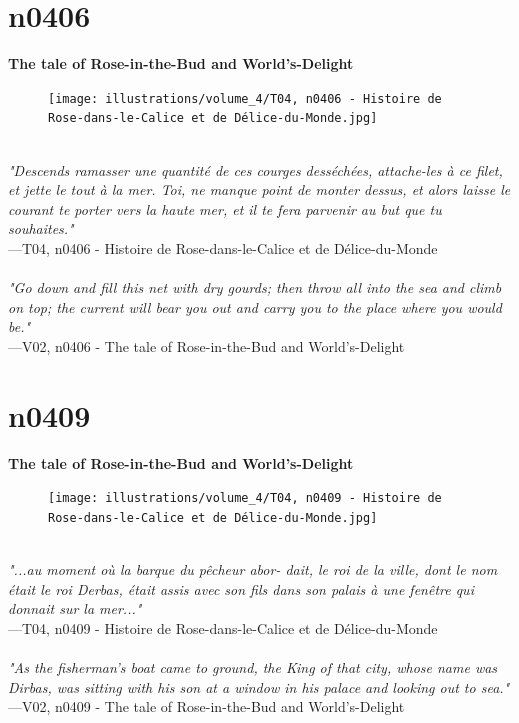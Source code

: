 \documentclass[../Carre_nights.tex]{subfiles}
\begin{document}
\newpage

\section{n0406}
\textbf{\Large{The tale of Rose-in-the-Bud and World’s-Delight}} \\

\begin{figure}[ht]
\centering
\texttt{[image: illustrations/volume\_4/T04, n0406 - Histoire de Rose-dans-le-Calice et de Délice-du-Monde.jpg]}
\end{figure}

\textit{\\
"Descends ramasser une quantité de ces courges desséchées, attache-les à ce filet, et jette le tout à la mer. Toi, ne manque point de monter dessus, et alors laisse le courant te porter vers la haute mer, et il te fera parvenir au but que tu souhaites."} \\
—T04, n0406 - Histoire de Rose-dans-le-Calice et de Délice-du-Monde \\~\\
\textit{"Go down and fill this net with dry gourds; then throw all into the sea and climb on top; the current will bear you out and carry you to the place where you would be."} \\
—V02, n0406 - The tale of Rose-in-the-Bud and World’s-Delight

\newpage

\section{n0409}
\textbf{\Large{The tale of Rose-in-the-Bud and World’s-Delight}} \\

\begin{figure}[ht]
\centering
\texttt{[image: illustrations/volume\_4/T04, n0409 - Histoire de Rose-dans-le-Calice et de Délice-du-Monde.jpg]}
\end{figure}

\textit{\\
"...au moment où la barque du pêcheur abor- dait, le roi de la ville, dont le nom était le roi Derbas, était assis avec son fils dans son palais à une fenêtre qui donnait sur la mer..."} \\
—T04, n0409 - Histoire de Rose-dans-le-Calice et de Délice-du-Monde \\~\\
\textit{"As the fisherman's boat came to ground, the King of that city, whose name was Dirbas, was sitting with his son at a window in his palace and looking out to sea."} \\
—V02, n0409 - The tale of Rose-in-the-Bud and World’s-Delight
\end{document}
